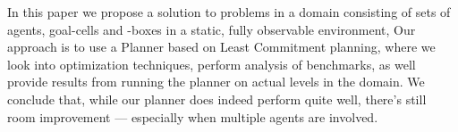 \documentclass[Main]{subfiles}
\begin{document}

In this paper we propose a solution to problems in a domain consisting of sets of agents, goal-cells and -boxes in a static, fully observable environment,
Our approach is to use a Planner based on Least Commitment planning, where we look into optimization techniques, perform analysis of benchmarks, as well provide results from running the planner on actual levels in the domain.
We conclude that, while our planner does indeed perform quite well, there's still room improvement --- especially when multiple agents are involved.

\end{document}
